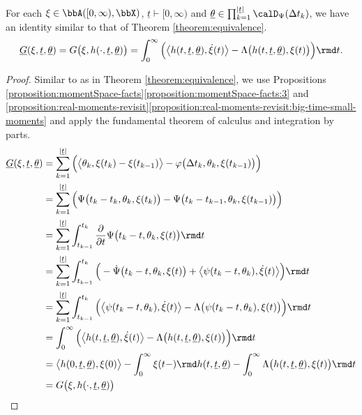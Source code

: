 \begin{lemma}
  \label{lemma:fdd-rf-as-integral}
  For each $\pathVar \in \acpathSpace{[0,\infty)}{\stateSpace}$, $\underline t \vdash [0,\infty)$ and $\underline\twistVar \in \prod_{k=1}^{|\underline t|} \momentSpace(\Delta t_k)$, we have an identity similar to that of Theorem \ref{theorem:equivalence}.
  \begin{equation*}
    \fddRf(\pathVar, \underline t, \underline\twistVar) = \mgRf\big(\pathVar, \twistFunc(\cdot, \underline t, \underline\twistVar)\big) = \int_0^\infty \Big( \bprj{\twistFunc(t, \underline t, \underline\twistVar)}{\dot\pathVar(t)} - \ode\big(\twistFunc(t, \underline t, \underline\twistVar), \pathVar(t)\big) \Big) \rmd t.
  \end{equation*}
\end{lemma}

\begin{proof}
  Similar to as in Theorem \ref{theorem:equivalence}, we use Propositions \ref{proposition:momentSpace-facts}\ref{proposition:momentSpace-facts:3} and \ref{proposition:real-moments-revisit}\ref{proposition:real-moments-revisit:big-time-small-moments} and apply the fundamental theorem of calculus and integration by parts.
  \begin{align*}
    \fddRf(\pathVar, \underline t, \underline\twistVar)
    &= \sum_{k=1}^{|\underline t|} \Big( \bprj{\twistVar_k}{\pathVar(t_k)-\pathVar(t_{k-1})} - \affShift\big(\Delta t_k, \twistVar_k, \pathVar(t_{k-1})\big) \Big) \\
    &= \sum_{k=1}^{|\underline t|} \Big( \aff\big(t_k-t_k, \twistVar_k, \pathVar(t_k) \big) - \aff\big(t_k-t_{k-1}, \twistVar_k, \pathVar(t_{k-1})\big) \Big) \\
    &= \sum_{k=1}^{|\underline t|} \int_{t_{k-1}}^{t_k} \frac{\partial}{\partial t} \aff\big(t_k-t, \twistVar_k, \pathVar(t)\big) \rmd t \\
    &= \sum_{k=1}^{|\underline t|} \int_{t_{k-1}}^{t_k} \Big( -\dot\aff\big(t_k-t, \twistVar_k, \pathVar(t)\big) + \bprj{\affPart(t_k-t, \twistVar_k)}{\dot\pathVar(t)} \Big) \rmd t \\
    &= \sum_{k=1}^{|\underline t|} \int_{t_{k-1}}^{t_k} \Big( \bprj{\affPart(t_k-t, \twistVar_k)}{\dot\pathVar(t)} - \ode\big( \affPart(t_k-t,\twistVar_k), \pathVar(t) \big)\Big) \rmd t \\
    &= \int_0^\infty \Big( \bprj{\twistFunc(t,\underline t,\underline\twistVar)}{\dot\pathVar(t)} - \ode\big(\twistFunc(t, \underline t, \underline\twistVar), \pathVar(t)\big) \Big) \rmd t \\
    &= \bprj{\twistFunc(0, \underline t, \underline\twistVar)}{\pathVar(0)} - \int_0^\infty \pathVar(t-) \rmd\twistFunc(t,\underline t,\underline\twistVar)- \int_0^\infty \ode\big(\twistFunc(t, \underline t, \underline\twistVar), \pathVar(t)\big) \rmd t \\
    &= \mgRf\big(\pathVar, \twistFunc(\cdot, \underline t, \underline\twistVar) \big)
  \end{align*}
\end{proof}

